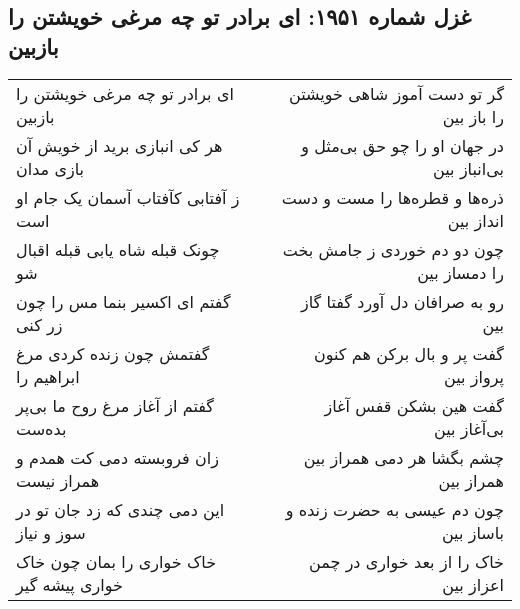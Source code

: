\begin{center}
\section*{غزل شماره ۱۹۵۱: ای برادر تو چه مرغی خویشتن را بازبین}
\label{sec:1951}
\begin{longtable}{l p{0.5cm} r}
ای برادر تو چه مرغی خویشتن را بازبین
&&
گر تو دست آموز شاهی خویشتن را باز بین
\\
هر کی انبازی برید از خویش آن بازی مدان
&&
در جهان او را چو حق بی‌مثل و بی‌انباز بین
\\
ز آفتابی کآفتاب آسمان یک جام او است
&&
ذره‌ها و قطره‌ها را مست و دست انداز بین
\\
چونک قبله شاه یابی قبله اقبال شو
&&
چون دو دم خوردی ز جامش بخت را دمساز بین
\\
گفتم ای اکسیر بنما مس را چون زر کنی
&&
رو به صرافان دل آورد گفتا گاز بین
\\
گفتمش چون زنده کردی مرغ ابراهیم را
&&
گفت پر و بال برکن هم کنون پرواز بین
\\
گفتم از آغاز مرغ روح ما بی‌پر بده‌ست
&&
گفت هین بشکن قفس آغاز بی‌آغاز بین
\\
زان فروبسته دمی کت همدم و همراز نیست
&&
چشم بگشا هر دمی همراز بین همراز بین
\\
این دمی چندی که زد جان تو در سوز و نیاز
&&
چون دم عیسی به حضرت زنده و باساز بین
\\
خاک خواری را بمان چون خاک خواری پیشه گیر
&&
خاک را از بعد خواری در چمن اعزاز بین
\\
\end{longtable}
\end{center}
